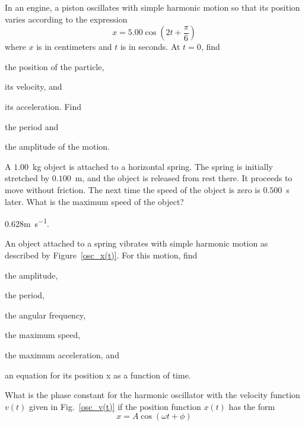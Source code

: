 \begin{problem}
	In an engine, a piston oscillates with simple harmonic
	motion so that its position varies according to the
	expression
	\[
		x= 5.00 \cos\left(2 t +\frac{\pi}{6}\right)
	\]
	where $x$ is in centimeters and $t$ is in seconds. At $t = 0$, find
	\begin{enumerate*}[label=(\alph*)]
		\item the position of the particle, 
		\item its velocity, and 
		\item its acceleration.
		Find
		\item the period and
		\item the amplitude of the motion.
	\end{enumerate*}
\end{problem}


\begin{problem}
	A $1.00$~kg object is attached to a horizontal spring. The spring is initially stretched by $0.100$~m, and the object is released from rest there. It proceeds to move without friction. The next time the speed of the object is zero is $0.500$~s later. What is the maximum speed of the object?
	\begin{solution}
		$0.628$\si{\meter\per\second}.
	\end{solution}
\end{problem}

\begin{problem}\label{prb:osc_x(t)}
	An object attached to a spring vibrates with simple harmonic motion as described by Figure~\ref{osc_x(t)}. For this motion, find
	\begin{enumerate*}[label=(\alph*)]
		\item the amplitude,
		\item the period,
		\item the angular frequency,
		\item the maximum speed,
		\item the maximum acceleration, and
		\item an equation for its position x as a function of time.
	\end{enumerate*}
\end{problem}


\begin{problem}\label{prb:osc_v(t)}
	What is the phase constant for the harmonic oscillator with the velocity function $v(t)$ given in Fig.~\ref{osc_v(t)} if the position function $x(t)$ has the form 
	\[
	x = A\cos(\omega t +\phi)
	\]
\end{problem}

